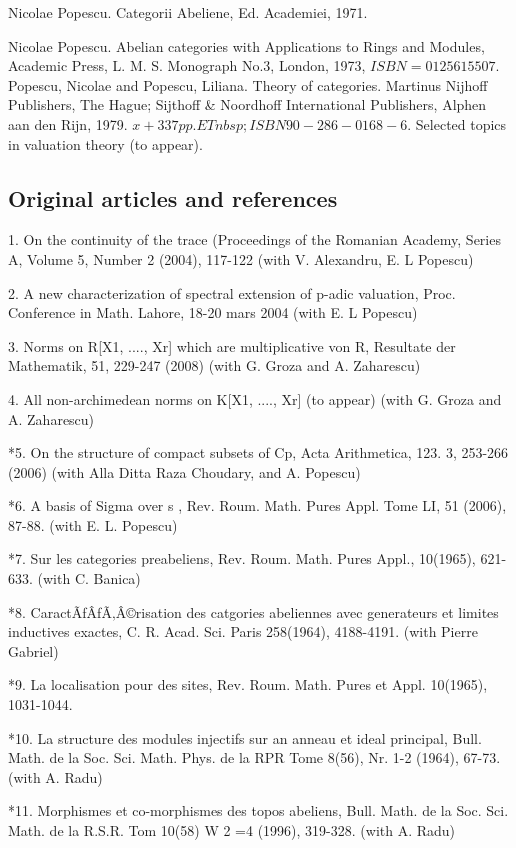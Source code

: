 \documentclass[12pt]{article}
\theoremstyle{plain}
\theoremstyle{definition}
\numberwithin{equation}{section}
\begin{document}
Nicolae Popescu. Categorii Abeliene, Ed. Academiei, 1971. 

Nicolae Popescu. Abelian categories with Applications to Rings and Modules, Academic Press, L. M. S. Monograph No.3, London, 1973, $ISBN=0125615507$.
Popescu, Nicolae and Popescu, Liliana. Theory of categories. Martinus Nijhoff Publishers, The Hague; Sijthoff \& Noordhoff International Publishers, Alphen aan den Rijn, 1979. $x+337 pp.ETnbsp;ISBN 90-286-0168-6.$
Selected topics in valuation theory (to appear).

\subsection{Original articles and references}
1.     On the continuity of the trace (Proceedings of the Romanian Academy, Series A, Volume 5, Number 2 (2004),  117-122 (with V. Alexandru, E. L Popescu)
 
2.     A new characterization of spectral extension of p-adic valuation, Proc. Conference in Math. Lahore, 18-20 mars 2004 (with E. L Popescu) 

3.     Norms on R[X1, ...., Xr] which are multiplicative von R, Resultate der Mathematik, 51, 229-247 (2008)  (with G. Groza and A. Zaharescu)

4.     All non-archimedean norms on K[X1, ...., Xr] (to appear) (with G. Groza and A. Zaharescu)

*5.     On the structure of compact subsets of Cp, Acta Arithmetica, 123. 3, 253-266 (2006) (with Alla Ditta Raza Choudary, and A. Popescu)

*6.     A basis of Sigma over s , Rev. Roum. Math. Pures Appl. Tome LI, 51 (2006), 87-88. (with E. L. Popescu)

*7.     Sur les categories preabeliens, Rev. Roum. Math. Pures Appl., 10(1965), 621-633. (with C. Banica) 

*8.     CaractÃƒÂƒÃ‚Â©risation des catgories abeliennes avec generateurs et limites inductives exactes, C. R. Acad. Sci. Paris 258(1964), 4188-4191. (with Pierre Gabriel)

*9.     La localisation pour des sites, Rev. Roum. Math. Pures et Appl. 10(1965), 1031-1044.
 
*10.    La structure des modules injectifs sur an anneau et ideal principal, Bull. Math. de la Soc. Sci. Math. Phys. de la RPR Tome 8(56), Nr. 1-2 (1964), 67-73. (with A. Radu) 

*11.    Morphismes et co-morphismes des topos abeliens, Bull. Math. de la Soc. Sci. Math. de la R.S.R. Tom 10(58) W 2 =4 (1996), 319-328. (with A. Radu) 
\end{document}
